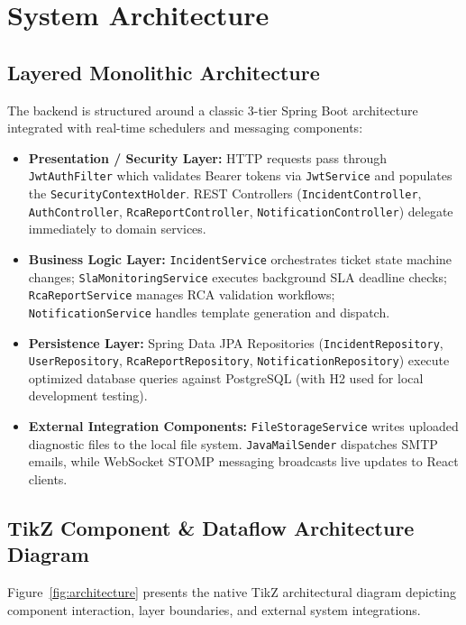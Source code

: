 \documentclass[12pt,a4paper]{report}
\begin{document}
\chapter{System Architecture}

\section{Layered Monolithic Architecture}
The backend is structured around a classic 3-tier Spring Boot architecture integrated with real-time schedulers and messaging components:
\begin{itemize}
    \item \textbf{Presentation / Security Layer:} HTTP requests pass through \texttt{JwtAuthFilter} which validates Bearer tokens via \texttt{JwtService} and populates the \texttt{SecurityContextHolder}. REST Controllers (\texttt{IncidentController}, \texttt{AuthController}, \texttt{RcaReportController}, \texttt{NotificationController}) delegate immediately to domain services.
    \item \textbf{Business Logic Layer:} \texttt{IncidentService} orchestrates ticket state machine changes; \texttt{SlaMonitoringService} executes background SLA deadline checks; \texttt{RcaReportService} manages RCA validation workflows; \texttt{NotificationService} handles template generation and dispatch.
    \item \textbf{Persistence Layer:} Spring Data JPA Repositories (\texttt{IncidentRepository}, \texttt{UserRepository}, \texttt{RcaReportRepository}, \texttt{NotificationRepository}) execute optimized database queries against PostgreSQL (with H2 used for local development testing).
    \item \textbf{External Integration Components:} \texttt{FileStorageService} writes uploaded diagnostic files to the local file system. \texttt{JavaMailSender} dispatches SMTP emails, while WebSocket STOMP messaging broadcasts live updates to React clients.
\end{itemize}

\section{TikZ Component \& Dataflow Architecture Diagram}
Figure~\ref{fig:architecture} presents the native TikZ architectural diagram depicting component interaction, layer boundaries, and external system integrations.
\end{document}
